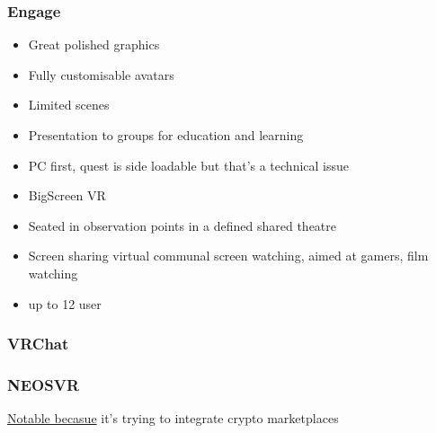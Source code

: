\subsubsection{Engage}
\begin{itemize}
\item Great polished graphics
\item Fully customisable avatars
\item Limited scenes
\item Presentation to groups for education and learning
\item PC first, quest is side loadable but that's a technical issue
\item BigScreen VR
\item Seated in observation points in a defined shared theatre
\item Screen sharing virtual communal screen watching, aimed at gamers, film watching
\item up to 12 user
\end{itemize}
\subsubsection{VRChat}
\subsubsection{NEOSVR}
\href{https://neos.com/}{Notable becasue} it's trying to integrate crypto marketplaces
